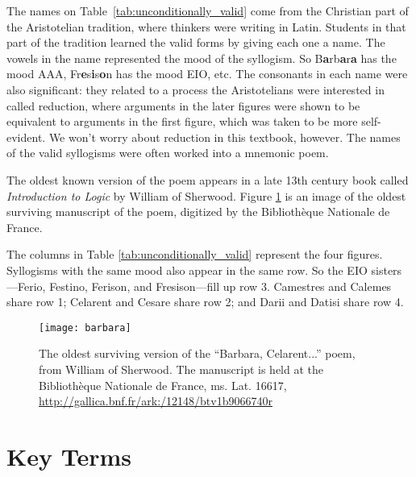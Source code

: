 The names on Table~\ref{tab:unconditionally_valid} come from the Christian part of the Aristotelian tradition, where thinkers were writing in Latin. Students in that part of the tradition learned the valid forms by giving each one a name. The vowels in the name represented the mood of the syllogism. So B\textbf{a}rb\textbf{a}r\textbf{a} has the mood AAA, Fr\textbf{e}s\textbf{i}s\textbf{o}n has the mood EIO, etc. The consonants in each name were also significant: they related to a process the Aristotelians were interested in called reduction, where arguments in the later figures were shown to be equivalent to arguments in the first figure, which was taken to be more self-evident. We won't worry about reduction in this textbook, however. The names of the valid syllogisms were often worked into a mnemonic poem.

The oldest known version of the poem appears in a late 13th century book called \textit{Introduction to Logic} by William of Sherwood. Figure \ref{fig:barbara} is an image of the oldest surviving manuscript of the poem, digitized by the Bibliothèque Nationale de France.

The columns in Table \ref{tab:unconditionally_valid} represent the four figures. Syllogisms with the same mood also appear in the same row. So the EIO sisters---Ferio, Festino, Ferison, and Fresison---fill up row 3.  Camestres and Calemes share row 1;  Celarent and Cesare share row 2; and Darii and Datisi share row 4.

\begin{figure}[!ht]
\texttt{[image: barbara]}

\caption{The oldest surviving version of the ``Barbara, Celarent...'' poem, from William of Sherwood. The manuscript is held at the Biblioth\`eque Nationale de France, ms. Lat. 16617, \url{http://gallica.bnf.fr/ark:/12148/btv1b9066740r}}
\label{fig:barbara}
\end{figure}


\section*{Key Terms}
\begin{sortedlist}

\end{sortedlist}

